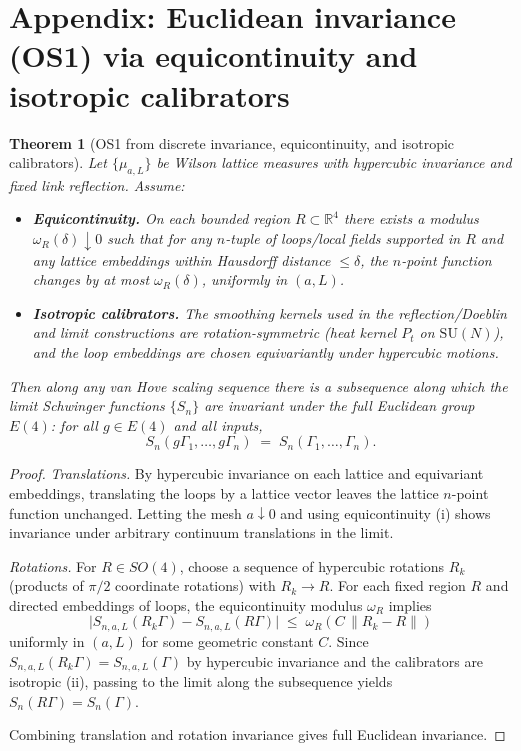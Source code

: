 \documentclass[11pt]{amsart}
\theoremstyle{plain}
\newtheorem{theorem}{Theorem}[section]
\theoremstyle{definition}
\theoremstyle{remark}
\begin{document}
\medskip
\section{Appendix: Euclidean invariance (OS1) via equicontinuity and isotropic calibrators}

\begin{theorem}[OS1 from discrete invariance, equicontinuity, and isotropic calibrators]\label{thm:os1-euclid}
Let $\{\mu_{a,L}\}$ be Wilson lattice measures with hypercubic invariance and fixed link reflection. Assume:
\begin{itemize}
  \item[(i)] \textbf{Equicontinuity.} On each bounded region $R\subset \mathbb R^4$ there exists a modulus $\omega_R(\delta)\downarrow 0$ such that for any $n$-tuple of loops/local fields supported in $R$ and any lattice embeddings within Hausdorff distance $\le \delta$, the $n$-point function changes by at most $\omega_R(\delta)$, uniformly in $(a,L)$.
  \item[(ii)] \textbf{Isotropic calibrators.} The smoothing kernels used in the reflection/Doeblin and limit constructions are rotation-symmetric (heat kernel $P_t$ on $\mathrm{SU}(N)$), and the loop embeddings are chosen equivariantly under hypercubic motions.
\end{itemize}
Then along any van Hove scaling sequence there is a subsequence along which the limit Schwinger functions $\{S_n\}$ are invariant under the full Euclidean group $E(4)$: for all $g\in E(4)$ and all inputs,
\[
  S_n(g\Gamma_1,\dots,g\Gamma_n)\;=\;S_n(\Gamma_1,\dots,\Gamma_n).
\]
\end{theorem}
\begin{proof}
\emph{Translations.} By hypercubic invariance on each lattice and equivariant embeddings, translating the loops by a lattice vector leaves the lattice $n$-point function unchanged. Letting the mesh $a\downarrow 0$ and using equicontinuity (i) shows invariance under arbitrary continuum translations in the limit.

\emph{Rotations.} For $R\in SO(4)$, choose a sequence of hypercubic rotations $R_k$ (products of $\pi/2$ coordinate rotations) with $R_k\to R$. For each fixed region $R$ and directed embeddings of loops, the equicontinuity modulus $\omega_R$ implies
\[
  \big|S_{n,a,L}(R_k\Gamma) - S_{n,a,L}(R\Gamma)\big|\;\le\; \omega_R(C\,\|R_k-R\|)
\]
uniformly in $(a,L)$ for some geometric constant $C$. Since $S_{n,a,L}(R_k\Gamma)=S_{n,a,L}(\Gamma)$ by hypercubic invariance and the calibrators are isotropic (ii), passing to the limit along the subsequence yields $S_n(R\Gamma)=S_n(\Gamma)$.

Combining translation and rotation invariance gives full Euclidean invariance.
\end{proof}
\end{document}
